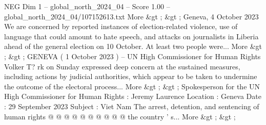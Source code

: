 \begin{textsample}{NEG Dim 1 – global\_north\_2024\_04 – Score 1.00 – global\_north\_2024\_04/107152613.txt}
More \&gt ; \&gt ; Geneva, 4 October 2023 We are concerned by reported instances of election-related violence, use of language that could amount to hate speech, and attacks on journalists in Liberia ahead of the general election on 10 October.
At least two people were...
More \&gt ; \&gt ; GENEVA ( 1 October 2023 ) -- UN High Commissioner for Human Rights Volker T? rk on Sunday expressed deep concern at the sustained measures, including actions by judicial authorities, which appear to be taken to undermine the outcome of the electoral process...
More \&gt ; \&gt ; Spokesperson for the UN High Commissioner for Human Rights : Jeremy Laurence Location : Geneva Date : 29 September 2023 Subject : Viet Nam The arrest, detention, and sentencing of human rights @ @ @ @ @ @ @ @ @ @ the country ' s...
More \&gt ; \&gt ;

\end{textsample}
